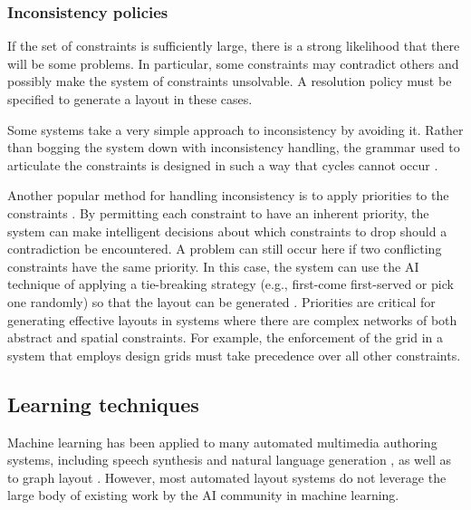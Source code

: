     \subsubsection{Inconsistency policies}

     If the set of constraints is sufficiently large, there is a strong
     likelihood that there will be some problems. In particular, some
     constraints may contradict others and possibly make the system of
     constraints unsolvable. A resolution policy must be specified to generate a
     layout in these cases.

     Some systems take a very simple approach to inconsistency by avoiding it.
     Rather than bogging the system down with inconsistency handling, the
     grammar used to articulate the constraints is designed in such a way that
     cycles cannot occur \citep{weitzman-2}.

     Another popular method for handling inconsistency is to apply priorities to
     the constraints \citep{graf-1}. By permitting each constraint to have an
     inherent priority, the system can make intelligent decisions about which
     constraints to drop should a contradiction be encountered. A problem can
     still occur here if two conflicting constraints have the same priority. In
     this case, the system can use the AI technique of applying a tie-breaking
     strategy (e.g., first-come first-served or pick one randomly) so that the
     layout can be generated \citep{nilsson-1}. Priorities are critical for
     generating effective layouts in systems where there are complex networks of
     both abstract and spatial constraints. For example, the enforcement of the
     grid in a system that employs design grids must take precedence over all
     other constraints.

   \subsection{Learning techniques}
    \label{learning-techniques}

    Machine learning has been applied to many automated multimedia authoring
    systems, including speech synthesis \citep{pan-1} and natural language
    generation \citep{kamimura-1}, as well as to graph layout \citep{masui-1}.
    However, most automated layout systems do not leverage the large body of
    existing work by the AI community in machine learning.

